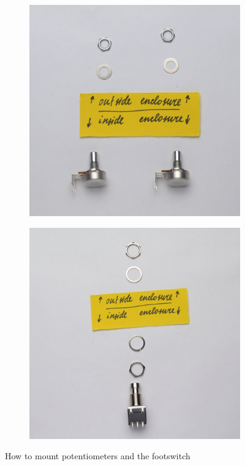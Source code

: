 \documentclass[a4paper,12pt]{article}
\begin{document}
\begin{figure}[h!]
  \centering
  \begin{subfigure}[b]{0.49\textwidth}
    \centering
    \includegraphics[width=\textwidth]{build/04-pots-mount-1000px.jpg}
  \end{subfigure}
  \begin{subfigure}[b]{0.49\textwidth}
    \centering
    \includegraphics[width=\textwidth]{build/05-fs-mount-1000px.jpg}
  \end{subfigure}
  \caption{How to mount potentiometers and the footswitch}
\end{figure}
\end{document}
